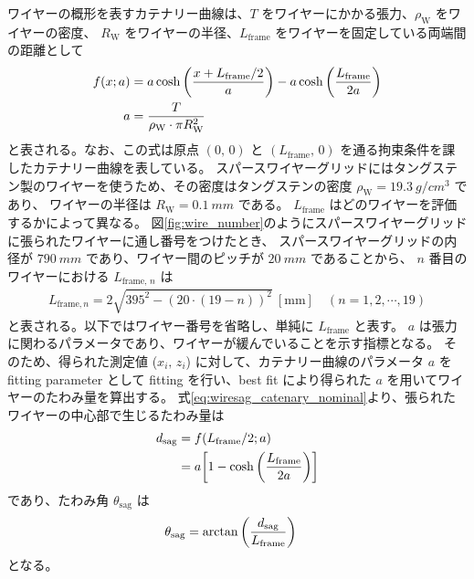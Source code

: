 \documentclass[../../main.tex]{subfiles}
\begin{document}
ワイヤーの概形を表すカテナリー曲線は、$T$ をワイヤーにかかる張力、$\rho_{\mathrm{W}}$ をワイヤーの密度、
$R_{\mathrm{W}}$ をワイヤーの半径、$L_{\mathrm{frame}}$ をワイヤーを固定している両端間の距離として
\begin{align}
    \label{eq:wiresag_catenary_nominal}
    f(x;a) &= a\cosh\qty(\dfrac{x+L_{\mathrm{frame}}/2}{a}) - a\cosh\qty(\dfrac{L_{\mathrm{frame}}}{2a}) \\
    a &= \dfrac{T}{\rho_{\mathrm{W}}\cdot\pi R_{\mathrm{W}}^2}
\end{align}
と表される。なお、この式は原点 $(0,\,0)$ と $(L_{\mathrm{frame}},\,0)$ を通る拘束条件を課したカテナリー曲線を表している。
スパースワイヤーグリッドにはタングステン製のワイヤーを使うため、その密度はタングステンの密度 $\rho_{\mathrm{W}}=\SI{19.3}{g/cm^3}$ であり、
ワイヤーの半径は $R_{\mathrm{W}}=\SI{0.1}{mm}$ である。
$L_{\mathrm{frame}}$ はどのワイヤーを評価するかによって異なる。
図\ref{fig:wire_number}のようにスパースワイヤーグリッドに張られたワイヤーに通し番号をつけたとき、
スパースワイヤーグリッドの内径が $\SI{790}{mm}$ であり、ワイヤー間のピッチが $\SI{20}{mm}$ であることから、
$n$ 番目のワイヤーにおける $L_{\mathrm{frame},\,n}$ は
\begin{align}
    L_{\mathrm{frame}, n} = 2\sqrt{395^2-(20\cdot(19-n))^2}\ [\mathrm{mm}] \quad (n=1,2,\cdots,19)
\end{align}
と表される。以下ではワイヤー番号を省略し、単純に $L_{\mathrm{frame}}$ と表す。
$a$ は張力に関わるパラメータであり、ワイヤーが緩んでいることを示す指標となる。
そのため、得られた測定値 ($x_{i},\,z_{i}$) に対して、カテナリー曲線のパラメータ $a$ を fitting parameter として
fitting を行い、best fit により得られた $a$ を用いてワイヤーのたわみ量を算出する。
式\eqref{eq:wiresag_catenary_nominal}より、張られたワイヤーの中心部で生じるたわみ量は
\begin{align}
    \label{eq:wiresag_sag}
    d_{\mathrm{sag}} &= f(L_{\mathrm{frame}}/2;a) \\
                     &= a\qty[1-\cosh\qty(\dfrac{L_{\mathrm{frame}}}{2a})]
\end{align}
であり、たわみ角 $\theta_{\mathrm{sag}}$ は
\begin{align}
    \label{eq:wiresag_sag_angle}
    \theta_{\mathrm{sag}} &= \arctan\qty(\dfrac{d_{\mathrm{sag}}}{L_{\mathrm{frame}}})
\end{align}
となる。
\end{document}
